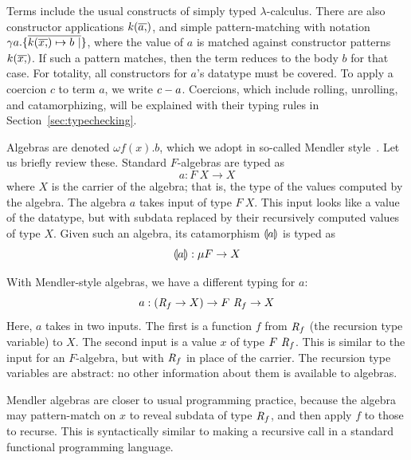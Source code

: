 \documentclass[runningheads]{llncs}
\begin{document}
Terms include the usual constructs of simply typed
$\lambda$-calculus. There are also constructor applications
$k(\overline{a ,})$, and simple pattern-matching with notation $\gamma a
. \{ \overline{k(\overline{x ,}) \mapsto b ~|} \}$, where the value of $a$
is matched against constructor patterns $k(\overline{x ,})$.  If such a
pattern matches, then the term reduces to the body $b$ for that
case. For totality, all constructors for $a$'s datatype must be
covered. To apply a coercion $c$ to term $a$, we write
$c - a$.  Coercions, which include rolling, unrolling, and
catamorphizing, will be explained with their typing rules in
Section~\ref{sec:typechecking}.

Algebras are denoted $\omega f(x) . b$, which we adopt in so-called
Mendler style~\cite{uustalu99}.  Let us briefly review these.
Standard $F$-algebras are typed as
\[
a : F\ X \to X
\]
\noindent where $X$ is the carrier of the algebra; that is, the type
of the values computed by the algebra.  The algebra $a$ takes input of
type $F\ X$.  This input looks like a value of the datatype, but with
subdata replaced by their recursively computed values of type $X$.
Given such an algebra, its catamorphism $\llparenthesis a \rrparenthesis$ is typed as
\[
\llparenthesis a \rrparenthesis : \mu F \to X
\]

\noindent With Mendler-style algebras, we have a different typing for $a$:
\[
a : (\textit{R}_{f} \to X) \to F\ \textit{R}_{f} \to X
\]
\noindent Here, $a$ takes in two inputs.  The first is a function $f$
from $\textit{R}_{f}$ (the recursion type variable) to $X$. The second
input is a value $x$ of type $F ~ \textit{R}_{f}$.  This is
similar to the input for an $F$-algebra, but with $\textit{R}_{f}$ in
place of the carrier.  The recursion type variables are abstract: no
other information about them is available to algebras.

Mendler algebras are closer to usual programming practice, because the
algebra may pattern-match on $x$ to reveal subdata of type
$\textit{R}_{f}$, and then apply $f$ to those to recurse.  This is
syntactically similar to making a recursive call in a standard
functional programming language.
\end{document}
